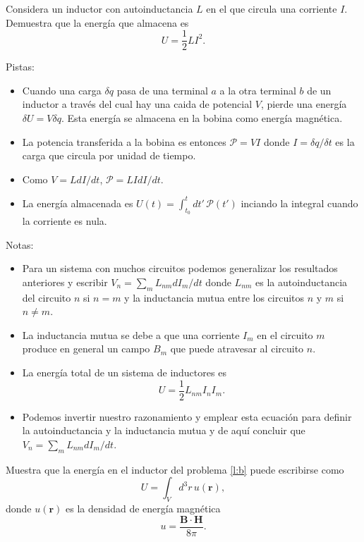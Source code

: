 \documentclass{exam}
\begin{document}
\begin{questions}
  \question Considera un inductor con autoinductancia $L$ en el que
  circula una corriente $I$. Demuestra que la energía que almacena es
  $$
  U=\frac{1}{2}LI^2.
  $$

  Pistas:
  \begin{itemize}
  \item Cuando una carga $\delta q$ pasa de una terminal $a$ a la otra
    terminal $b$ de un inductor a través del cual hay una caida de
    potencial $V$, pierde una energía $\delta U=V\delta q$. Esta
    energía se almacena en la bobina como energía magnética.
  \item La potencia transferida a la bobina es entonces $\mathcal
    P=VI$ donde $I=\delta q/\delta t$ es la carga que circula por
    unidad de tiempo.
  \item Como $V=L dI/dt$, $\mathcal P=LIdI/dt$.
  \item La energía almacenada es $U(t)=\int^t_{t_0} dt'\,\mathcal
    P(t')$ inciando la integral cuando la
    corriente es nula.
  \end{itemize}
  Notas:
  \begin{itemize}
  \item Para un sistema con muchos circuitos podemos generalizar los
    resultados anteriores y escribir
    $V_n=\sum_m L_{nm}dI_m/dt$ donde $L_{nm}$ es la autoinductancia
    del circuito $n$ si $n=m$ y la inductancia mutua entre los
    circuitos $n$ y $m$ si $n\ne m$.
  \item La inductancia mutua se debe a que una corriente $I_m$ en el
    circuito $m$ produce en general un campo $B_m$ que puede atravesar
    al circuito $n$.
  \item La energía total de un sistema de inductores es
    $$U=\frac{1}{2}L_{nm}I_nI_m.$$
  \item Podemos invertir nuestro razonamiento y emplear esta ecuación
    para definir la autoinductancia y la inductancia mutua y de aquí
    concluir que $V_n=\sum_m L_{nm}dI_m/dt$.
  \end{itemize}

  \question Muestra que la energía en el inductor del problema
  \ref{l:b} puede escribirse como
  $$
  U=\int_V d^3r\, u(\bm r),
  $$
  donde $u(\bm r)$ es la densidad de energía magnética
  $$
  u=\frac{\bm B\cdot\bm H}{8\pi}.
  $$


\end{questions}
\end{document}
